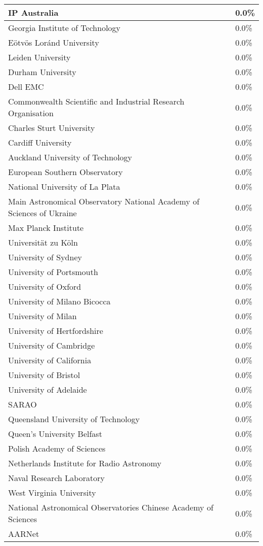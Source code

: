 \documentclass{article}%
\begin{document}
\begin{longtabu}{X[l] X[r]}
\hline%
IP Australia&0.0\%\\%
\hline%
Georgia Institute of Technology&0.0\%\\%
\hline%
Eötvös Loránd University&0.0\%\\%
\hline%
Leiden University&0.0\%\\%
\hline%
Durham University&0.0\%\\%
\hline%
Dell EMC&0.0\%\\%
\hline%
Commonwealth Scientific and Industrial Research Organisation&0.0\%\\%
\hline%
Charles Sturt University&0.0\%\\%
\hline%
Cardiff University&0.0\%\\%
\hline%
Auckland University of Technology&0.0\%\\%
\hline%
European Southern Observatory&0.0\%\\%
\hline%
National University of La Plata&0.0\%\\%
\hline%
Main Astronomical Observatory National Academy of Sciences of Ukraine&0.0\%\\%
\hline%
Max Planck Institute&0.0\%\\%
\hline%
Universität zu Köln&0.0\%\\%
\hline%
University of Sydney&0.0\%\\%
\hline%
University of Portsmouth&0.0\%\\%
\hline%
University of Oxford&0.0\%\\%
\hline%
University of Milano Bicocca&0.0\%\\%
\hline%
University of Milan&0.0\%\\%
\hline%
University of Hertfordshire&0.0\%\\%
\hline%
University of Cambridge&0.0\%\\%
\hline%
University of California&0.0\%\\%
\hline%
University of Bristol&0.0\%\\%
\hline%
University of Adelaide&0.0\%\\%
\hline%
SARAO&0.0\%\\%
\hline%
Queensland University of Technology&0.0\%\\%
\hline%
Queen's University Belfast&0.0\%\\%
\hline%
Polish Academy of Sciences&0.0\%\\%
\hline%
Netherlands Institute for Radio Astronomy&0.0\%\\%
\hline%
Naval Research Laboratory&0.0\%\\%
\hline%
West Virginia University&0.0\%\\%
\hline%
National Astronomical Observatories Chinese Academy of Sciences&0.0\%\\%
\hline%
AARNet&0.0\%\\%
\hline%
\end{longtabu}%
\end{document}
